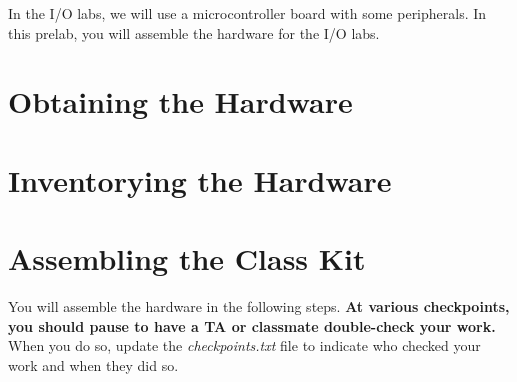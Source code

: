 






\renewcommand{\labnumber}{\ioprelabnumber}
\renewcommand{\labname}{Physical Assembly of Hardware for I/O Labs}
\renewcommand{\shortlabname}{i/o-prelab}
\renewcommand{\collaborationrules}{\ioprelabcollaboration}
\renewcommand{\duedate}{\ioprelabdue}


\pagelayout

\labidentifier

In the I/O labs, we will use a microcontroller board with some peripherals.
In this prelab, you will assemble the hardware for the I/O labs.

\section{Obtaining the Hardware}                            \obtaininghardware

\section{Inventorying the Hardware} \label{sec:inventory}   

\vspace{0.5cm}

\section*{Assembling the Class Kit}

    You will assemble the hardware in the following steps.
    \textbf{At various checkpoints, you should pause to have a TA or classmate double-check your work.}
    When you do so, update the \textit{checkpoints.txt} file to indicate who checked your work and when they did so.

